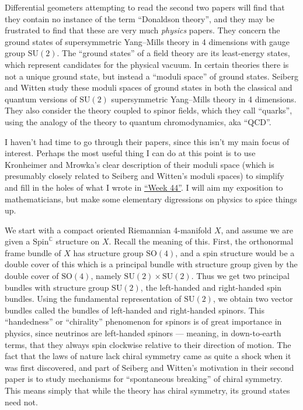 \documentclass[12pt]{article}
\begin{document}
Differential geometers attempting to read the second two papers will
find that they contain no instance of the term ``Donaldson theory'', and
they may be frustrated to find that these are very much \emph{physics}
papers. They concern the ground states of supersymmetric Yang--Mills
theory in 4 dimensions with gauge group \(\mathrm{SU}(2)\). The ``ground
states'' of a field theory are its least-energy states, which represent
candidates for the physical vacuum. In certain theories there is not a
unique ground state, but instead a ``moduli space'' of ground states.
Seiberg and Witten study these moduli spaces of ground states in both
the classical and quantum versions of \(\mathrm{SU}(2)\) supersymmetric
Yang--Mills theory in 4 dimensions. They also consider the theory coupled
to spinor fields, which they call ``quarks'', using the analogy of the
theory to quantum chromodynamics, aka ``QCD''.

I haven't had time to go through their papers, since this isn't my main
focus of interest. Perhaps the most useful thing I can do at this point
is to use Kronheimer and Mrowka's clear description of their moduli
space (which is presumably closely related to Seiberg and Witten's
moduli spaces) to simplify and fill in the holes of what I wrote in
\protect\hyperlink{week44}{``Week 44''}. I will aim my exposition to
mathematicians, but make some elementary digressions on physics to spice
things up.

We start with a compact oriented Riemannian 4-manifold \(X\), and assume
we are given a $\mathrm{Spin}^{\mathbb{C}}$ structure on $X$. Recall the meaning of this.
First, the orthonormal frame bundle of \(X\) has structure group
\(\mathrm{SO}(4)\), and a spin structure would be a double cover of this
which is a principal bundle with structure group given by the double
cover of \(\mathrm{SO}(4)\), namely
\(\mathrm{SU}(2) \times \mathrm{SU}(2)\). Thus we get two principal
bundles with structure group \(\mathrm{SU}(2)\), the left-handed and
right-handed spin bundles. Using the fundamental representation of
\(\mathrm{SU}(2)\), we obtain two vector bundles called the bundles of
left-handed and right-handed spinors. This ``handedness'' or
``chirality'' phenomenon for spinors is of great importance in physics,
since neutrinos are left-handed spinors --- meaning, in down-to-earth
terms, that they always spin clockwise relative to their direction of
motion. The fact that the laws of nature lack chiral symmetry came as
quite a shock when it was first discovered, and part of Seiberg and
Witten's motivation in their second paper is to study mechanisms for
``spontaneous breaking'' of chiral symmetry. This means simply that
while the theory has chiral symmetry, its ground states need not.
\end{document}
